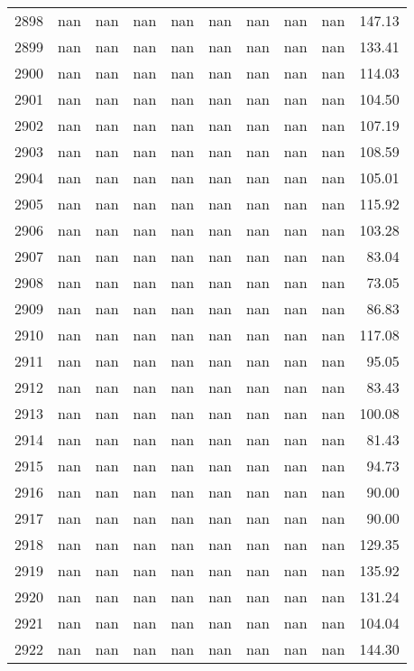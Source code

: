 \begin{tabular}{lrrrrrrrrr}
2898 & nan & nan & nan & nan & nan & nan & nan & nan & 147.13 \\
2899 & nan & nan & nan & nan & nan & nan & nan & nan & 133.41 \\
2900 & nan & nan & nan & nan & nan & nan & nan & nan & 114.03 \\
2901 & nan & nan & nan & nan & nan & nan & nan & nan & 104.50 \\
2902 & nan & nan & nan & nan & nan & nan & nan & nan & 107.19 \\
2903 & nan & nan & nan & nan & nan & nan & nan & nan & 108.59 \\
2904 & nan & nan & nan & nan & nan & nan & nan & nan & 105.01 \\
2905 & nan & nan & nan & nan & nan & nan & nan & nan & 115.92 \\
2906 & nan & nan & nan & nan & nan & nan & nan & nan & 103.28 \\
2907 & nan & nan & nan & nan & nan & nan & nan & nan & 83.04 \\
2908 & nan & nan & nan & nan & nan & nan & nan & nan & 73.05 \\
2909 & nan & nan & nan & nan & nan & nan & nan & nan & 86.83 \\
2910 & nan & nan & nan & nan & nan & nan & nan & nan & 117.08 \\
2911 & nan & nan & nan & nan & nan & nan & nan & nan & 95.05 \\
2912 & nan & nan & nan & nan & nan & nan & nan & nan & 83.43 \\
2913 & nan & nan & nan & nan & nan & nan & nan & nan & 100.08 \\
2914 & nan & nan & nan & nan & nan & nan & nan & nan & 81.43 \\
2915 & nan & nan & nan & nan & nan & nan & nan & nan & 94.73 \\
2916 & nan & nan & nan & nan & nan & nan & nan & nan & 90.00 \\
2917 & nan & nan & nan & nan & nan & nan & nan & nan & 90.00 \\
2918 & nan & nan & nan & nan & nan & nan & nan & nan & 129.35 \\
2919 & nan & nan & nan & nan & nan & nan & nan & nan & 135.92 \\
2920 & nan & nan & nan & nan & nan & nan & nan & nan & 131.24 \\
2921 & nan & nan & nan & nan & nan & nan & nan & nan & 104.04 \\
2922 & nan & nan & nan & nan & nan & nan & nan & nan & 144.30 \\

\end{tabular}
